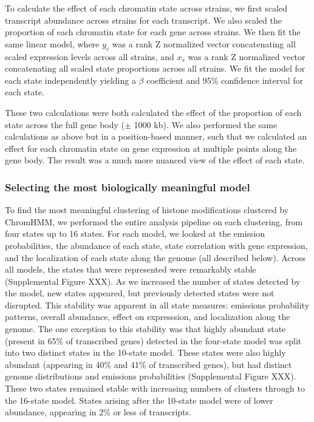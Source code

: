 \documentclass[10pt,letterpaper]{article}
\begin{document}
To calculate the effect of each chromatin state across strains, we first
scaled transcript abundance across strains for each transcript. We also
scaled the proportion of each chromatin state for each gene across
strains. We then fit the same linear model, where \(y_{e}\) was a rank Z
normalized vector concatenating all scaled expression levels across all
strains, and \(x_{s}\) was a rank Z normalized vector concatenating all
scaled state proportions across all strains. We fit the model for each
state independently yielding a \(\beta\) coefficient and 95\% confidence
interval for each state.

These two calculations were both calculated the effect of the proportion
of each state across the full gene body (\(\pm\) 1000 kb). We also
performed the same calculations as above but in a position-based manner,
such that we calculated an effect for each chromatin state on gene
expression at multiple points along the gene body. The result was a much
more nuanced view of the effect of each state.

\hypertarget{selecting-the-most-biologically-meaningful-model}{%
\subsubsection{Selecting the most biologically meaningful
model}\label{selecting-the-most-biologically-meaningful-model}}

To find the most meaningful clustering of histone modifications
clustered by ChromHMM, we performed the entire analysis pipeline on each
clustering, from four states up to 16 states. For each model, we looked
at the emission probabilities, the abundance of each state, state
correlation with gene expression, and the localization of each state
along the genome (all described below). Across all models, the states
that were represented were remarkably stable (Supplemental Figure XXX).
As we increased the number of states detected by the model, new states
appeared, but previously detected states were not disrupted. This
stability was apparent in all state measures: emissions probability
patterns, overall abundance, effect on expresssion, and localization
along the genome. The one exception to this stability was that highly
abundant state (present in 65\% of transcribed genes) detected in the
four-state model was split into two distinct states in the 10-state
model. These states were also highly abundant (appearing in 40\% and
41\% of transcribed genes), but had distinct genome distributions and
emissions probabilities (Supplemental Figure XXX). These two states
remained stable with increasing numbers of clusters through to the
16-state model. States arising after the 10-state model were of lower
abundance, appearing in 2\% or less of transcripts.
\end{document}
